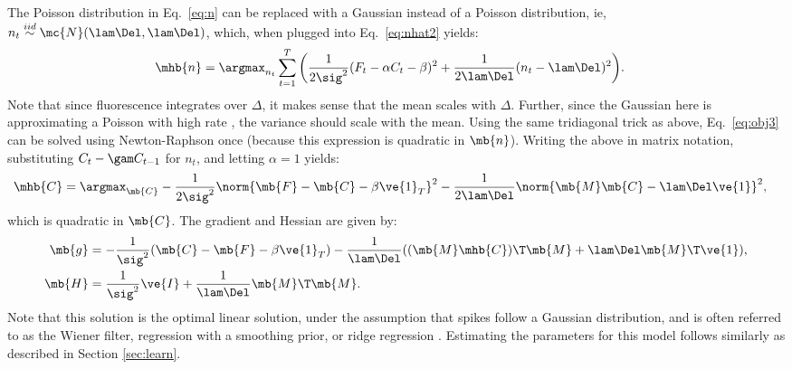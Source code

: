 The Poisson distribution in Eq.~\eqref{eq:n} can be replaced with a Gaussian instead of a Poisson distribution, ie,  $n_t \overset{iid}{\sim} \mc{N}(\lam \Del, \lam \Del)$, which, when plugged into Eq.~\eqref{eq:nhat2} yields:
\begin{align} \label{eq:obj5}
\mhb{n} &= \argmax_{n_t}  \sum_{t=1}^T \bigg( \frac{1}{2 \sig^2}(F_t - \alpha C_t - \beta)^2  + 
 \frac{1}{2 \lam \Del}(n_t - \lam \Del)^2\bigg).
\end{align}
Note that since fluorescence integrates over $\Delta$, it makes sense that the mean scales with $\Delta$.  Further, since the Gaussian here is approximating a Poisson with high rate \cite{SjulsonMiesenbock07}, the variance should scale with the mean.  Using the same tridiagonal trick as above, Eq.~\eqref{eq:obj3} can be solved using Newton-Raphson once (because this expression is quadratic in $\mb{n}$).  Writing the above in matrix notation, substituting $C_t - \gam C_{t-1}$ for $n_t$, and letting $\alpha=1$ yields:
\begin{align}   \label{eq:w2}
\mhb{C}&= \argmax_{\mb{C}} -\frac{1}{2\sig^2} \norm{\mb{F} - \mb{C} - \beta\ve{1}_T}^2 - \frac{1}{2\lam\Del} \norm{\mb{M} \mb{C} - \lam\Del\ve{1}}^2,
\end{align}
\noindent which is quadratic in $\mb{C}$.  The gradient and Hessian are given by:
\begin{align}
\mb{g} &= -\frac{1}{\sig^2} (\mb{C} - \mb{F} - \beta\ve{1}_T) - \frac{1}{\lam\Del} ( (\mb{M} \mhb{C})\T \mb{M} + \lam\Del \mb{M}\T \ve{1}), \\
\mb{H} &= \frac{1}{\sig^2} \ve{I} + \frac{1}{\lam\Del} \mb{M}\T \mb{M}.
\end{align}
Note that this solution is the optimal linear solution, under the assumption that spikes follow a Gaussian distribution, and is often referred to as the Wiener filter, regression with a smoothing prior, or ridge regression \cite{CONV04}.  Estimating the parameters for this model follows similarly as described in Section \ref{sec:learn}.


\clearpage
 
% 
%
%

%

% 

